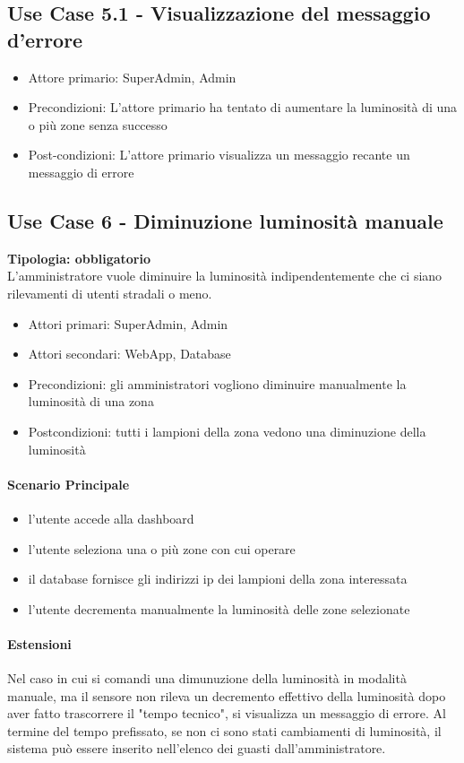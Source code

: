 \documentclass[12pt]{article}
\begin{document}
\subsection{Use Case 5.1 - Visualizzazione del messaggio d'errore}
\begin{itemize}
	\item Attore primario: SuperAdmin, Admin
	\item Precondizioni: L'attore primario ha tentato di aumentare la luminosità di una o più zone senza successo
	\item Post-condizioni: L'attore primario visualizza un messaggio recante un messaggio di errore
\end{itemize}

\subsection{Use Case 6 - Diminuzione luminosità manuale}
\textbf{Tipologia: obbligatorio} \\
L'amministratore vuole diminuire la luminosità indipendentemente che ci siano rilevamenti di utenti stradali o meno.
\begin{itemize}
	\item Attori primari: SuperAdmin, Admin
	\item Attori secondari: WebApp, Database
	\item Precondizioni: gli amministratori vogliono diminuire manualmente la luminosità di una zona
	\item Postcondizioni: tutti i lampioni della zona vedono una diminuzione della luminosità
\end{itemize}
\paragraph{Scenario Principale}
\begin{itemize}
	\item l'utente accede alla dashboard
	\item l'utente seleziona una o più zone con cui operare
 	\item il database fornisce gli indirizzi ip dei lampioni della zona interessata
	\item l'utente decrementa manualmente la luminosità delle zone selezionate
\end{itemize}
\paragraph{Estensioni} Nel caso in cui si comandi una dimunuzione della luminosità in modalità manuale, ma il sensore non rileva un decremento effettivo della luminosità dopo aver fatto trascorrere il "tempo tecnico", si visualizza un messaggio di errore.
Al termine del tempo prefissato, se non ci sono stati cambiamenti di luminosità, il sistema può essere inserito nell'elenco dei guasti dall'amministratore.
\end{document}
